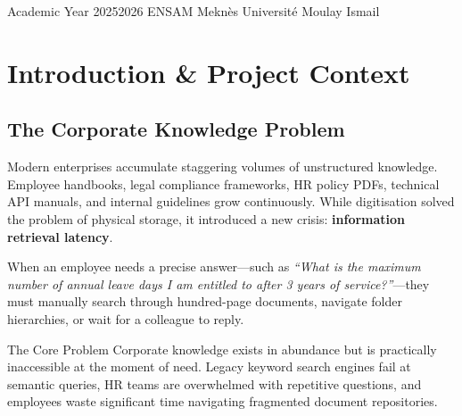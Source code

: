 \documentclass[12pt,a4paper]{report}
\begin{document}
\begin{titlepage}
\vspace{1.4cm}

\vfill

\begin{tcolorbox}[
  enhanced, colback=DarkEarth, colframe=DarkEarth,
  arc=0pt, boxrule=0pt,
  left=2cm, right=2cm, top=0.5cm, bottom=0.5cm,
  width=\paperwidth, enlarge left by=-2.8cm
]
  \centering
  \textcolor{Cream!80}{\sffamily\small
    Academic Year 2025\textendash{}2026
    \quad\textbar\quad ENSAM Meknès
    \quad\textbar\quad Université Moulay Ismail}
\end{tcolorbox}

\end{titlepage}
\pagecolor{white}

\clearpage
{}
\tableofcontents
\clearpage
\listoffigures
\clearpage
\listoftables

\clearpage
{}

\chapter{Introduction \& Project Context}

\section{The Corporate Knowledge Problem}

Modern enterprises accumulate staggering volumes of unstructured knowledge. Employee handbooks, legal compliance frameworks, HR policy PDFs, technical API manuals, and internal guidelines grow continuously. While digitisation solved the problem of physical storage, it introduced a new crisis: \textbf{information retrieval latency}.

When an employee needs a precise answer—such as \textit{``What is the maximum number of annual leave days I am entitled to after 3 years of service?''}—they must manually search through hundred-page documents, navigate folder hierarchies, or wait for a colleague to reply.

\begin{conceptbox}{The Core Problem}
Corporate knowledge exists in abundance but is practically inaccessible at the moment of need. Legacy keyword search engines fail at semantic queries, HR teams are overwhelmed with repetitive questions, and employees waste significant time navigating fragmented document repositories.
\end{conceptbox}
\end{document}
